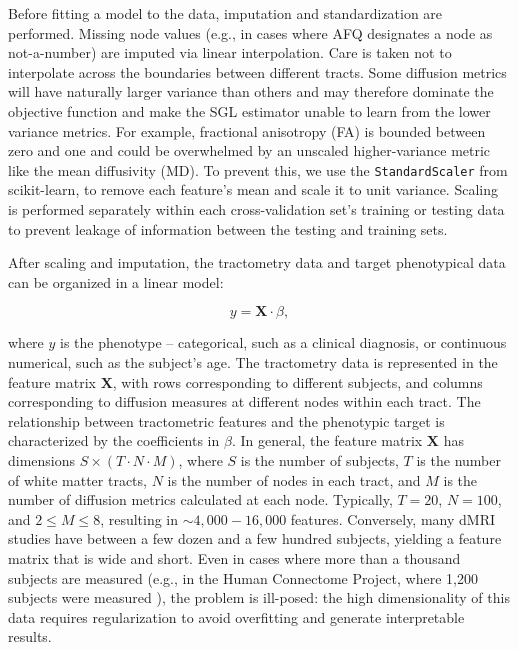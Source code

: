 Before fitting a model to the data, imputation and standardization are
performed. Missing node values (e.g., in cases where AFQ designates a node as
not-a-number) are imputed via linear interpolation. Care is taken not to
interpolate across the boundaries between different tracts. Some diffusion
metrics will have naturally larger variance than others and may therefore
dominate the objective function and make the SGL estimator unable to learn from
the lower variance metrics. For example, fractional anisotropy (FA) is bounded
between zero and one and could be overwhelmed by an unscaled higher-variance
metric like the mean diffusivity (MD). To prevent this, we use the
\lstinline{StandardScaler} from scikit-learn\cite{scikit-learn}, to remove each
feature's mean and scale it to unit variance. Scaling is performed separately
within each cross-validation set's training or testing data to prevent leakage
of information between the testing and training sets\cite{kaufman2012leakage}.

After scaling and imputation, the tractometry data and target phenotypical data
can be organized in a linear model:

\begin{equation}
y = \mathbf{X} \cdot \beta,
\label{eq:lm}
\end{equation}

where $y$ is the phenotype -- categorical, such as a clinical diagnosis, or
continuous numerical, such as the subject's age. The tractometry data is
represented in the feature matrix $\mathbf{X}$, with rows corresponding to
different subjects, and columns corresponding to diffusion measures at different
nodes within each tract. The relationship between tractometric features and the
phenotypic target is characterized by the coefficients in $\beta$. In general,
the feature matrix $\mathbf{X}$ has dimensions $S \times (T \cdot N \cdot M)$,
where $S$ is the number of subjects, $T$ is the number of white matter tracts,
$N$ is the number of nodes in each tract, and $M$ is the number of diffusion
metrics calculated at each node. Typically, $T = 20$, $N = 100$, and $2 \le M
\le 8$, resulting in $\sim 4,000 - 16,000$  features. Conversely, many dMRI
studies have between a few dozen and a few hundred subjects, yielding a feature
matrix that is wide and short. Even in cases where more than a thousand subjects
are measured (e.g., in the Human Connectome Project, where 1,200 subjects were
measured \cite{VanEssen2012}), the problem is ill-posed: the high dimensionality
of this data requires regularization to avoid overfitting and generate
interpretable results.

